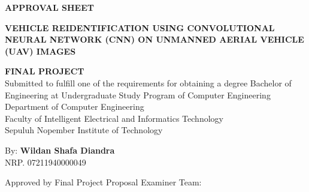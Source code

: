 \begin{center}
  \large
  \textbf{APPROVAL SHEET}
\end{center}

\thispagestyle{empty}

\begin{center}
  \textbf{
    VEHICLE REIDENTIFICATION USING CONVOLUTIONAL NEURAL NETWORK (CNN)
    ON UNMANNED AERIAL VEHICLE (UAV) IMAGES}
\end{center}

\begingroup
\small

\begin{center}
  \textbf{FINAL PROJECT} \\
  Submitted to fulfill one of the requirements for obtaining a degree
  Bachelor of Engineering at
  Undergraduate Study Program of Computer Engineering \\
  Department of Computer Engineering \\
  Faculty of Intelligent Electrical and Informatics Technology \\
  Sepuluh Nopember Institute of Technology
\end{center}

\begin{center}
  By: \textbf{Wildan Shafa Diandra} \\
  NRP. 07211940000049
\end{center}

\begin{center}
  Approved by Final Project Proposal Examiner Team:
\end{center}

\begingroup
\setlength{\tabcolsep}{0pt}

